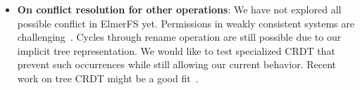 \documentclass[sigconf, 10pt]{acmart}
\begin{document}
\begin{itemize}
    \item \textbf{On conflict resolution for other operations}: We have not explored all possible conflict in ElmerFS yet.
    Permissions in weakly consistent systems are challenging~\cite{yanakieva2021access}.
    Cycles through rename operation are still possible due to our implicit tree representation.
    We would like to test specialized CRDT that prevent such occurrences while still allowing our current behavior. Recent work on tree CRDT might be a good fit~\cite{nair:hal-03150817}.
\end{itemize}






\end{document}

